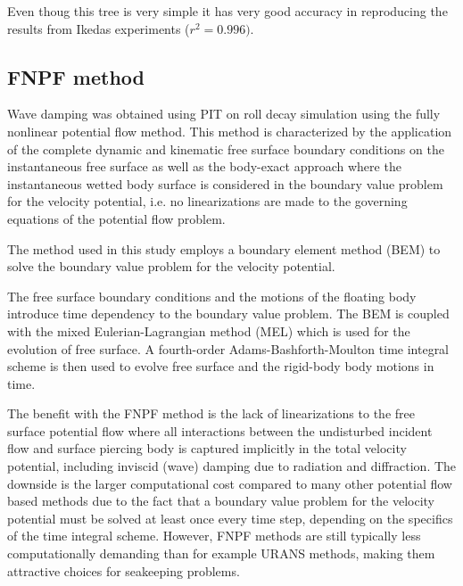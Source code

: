     Even thoug this tree is very simple it has very good accuracy in
reproducing the results from Ikedas experiments ($r^2=0.996)$.

    \subsection*{FNPF method}\label{fnpf-method}

\label{fnpf-method} Wave damping was obtained using PIT on roll decay
simulation using the fully nonlinear potential flow method. This method
is characterized by the application of the complete dynamic and
kinematic free surface boundary conditions on the instantaneous free
surface as well as the body-exact approach where the instantaneous
wetted body surface is considered in the boundary value problem for the
velocity potential, i.e. no linearizations are made to the governing
equations of the potential flow problem.

The method used in this study employs a boundary element method (BEM)
\cite{7505983/FD4N3DW2} to solve the boundary value problem for the
velocity potential.

The free surface boundary conditions and the motions of the floating
body introduce time dependency to the boundary value problem. The BEM is
coupled with the mixed Eulerian-Lagrangian method (MEL)
\cite{7505983/ZKB494GT} which is used for the evolution of free surface.
A fourth-order Adams-Bashforth-Moulton time integral scheme is then used
to evolve free surface and the rigid-body body motions in time.

The benefit with the FNPF method is the lack of linearizations to the
free surface potential flow where all interactions between the
undisturbed incident flow and surface piercing body is captured
implicitly in the total velocity potential, including inviscid (wave)
damping due to radiation and diffraction. The downside is the larger
computational cost compared to many other potential flow based methods
due to the fact that a boundary value problem for the velocity potential
must be solved at least once every time step, depending on the specifics
of the time integral scheme. However, FNPF methods are still typically
less computationally demanding than for example URANS methods, making
them attractive choices for seakeeping problems.

    